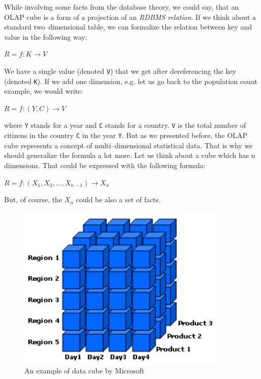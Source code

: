 While involving some facts from the database theory, we could say, that an OLAP cube is a form
of a projection of an \emph{RDBMS relation}. If we think about a standard two--dimensional table, we can
formalize the relation between key and value in the following way:

\begin{center}
$R = f: K \rightarrow V$
\end{center}

We have a single value (denoted \texttt{V}) that we get after dereferencing the key (denoted \texttt{K}).
If we add one dimension, e.g. let us go back to the population count example, we would write:

\begin{center}
$R = f: (Y,C) \rightarrow V$
\end{center}

where \texttt{Y} stands for a year and \texttt{C} stands for a country. \texttt{V} is the total number of
citizens in the country \texttt{C} in the year \texttt{Y}.
But as we presented before, the OLAP cube represents a concept of
multi--dimensional statistical data. That is why we should generalize the formula a lot more.
Let us think about a cube which has n dimensions. That could be expressed with the following
formula:

\begin{center}
$R = f: (X_{1}, X_{2}, …, X_{n-1}) \rightarrow X_{n}$
\end{center}

But, of course, the $X_{n}$ could be also a set of facts.


\begin{figure}
	\centering
	\includegraphics[width=100mm]{img/data-cube.png}
	\caption{An example of data cube by Microsoft~\cite{msdn-cube}}
	\label{fig:lod-cloud}
\end{figure}

